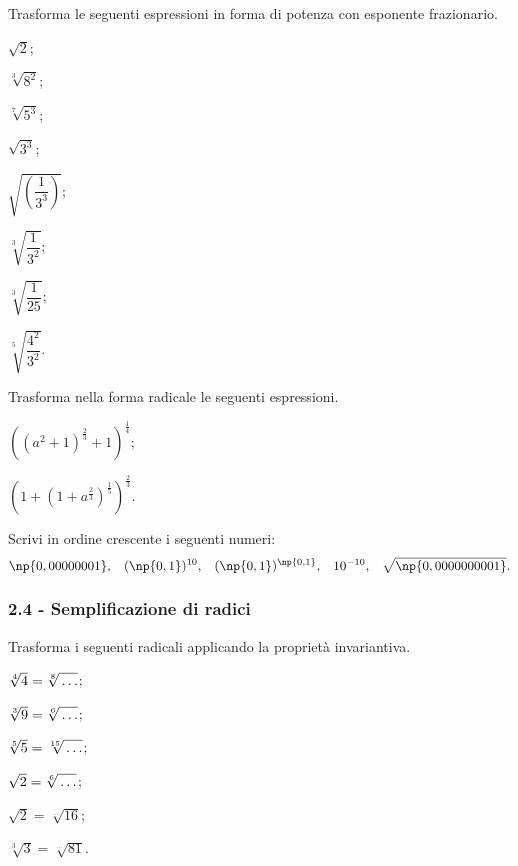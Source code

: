 \begin{esercizio}[\Ast]
 \label{ese:2.19}
Trasforma le seguenti espressioni in forma di potenza con esponente frazionario.
 \begin{multicols}{3}
 \begin{enumeratea}
 \item $\sqrt 2$;
 \item $\sqrt[3]{8^2}$;
 \item $\sqrt[7]{5^3}$;
 \item $\sqrt{3^3}$;
 \item $\sqrt{\left(\dfrac 1{3^3}\right)}$;
 \item $\sqrt[3]{\dfrac 1{3^2}}$;
 \item $\sqrt[3]{\dfrac 1{25}}$;
 \item $\sqrt[5]{\dfrac{4^2}{3^2}}$.
 \end{enumeratea}
 \end{multicols}
\end{esercizio}
\pagebreak
\begin{esercizio}[\Ast]
\label{ese:2.20}
 Trasforma nella forma radicale le seguenti espressioni.
 \begin{multicols}{2}
 \begin{enumeratea}
 \item $\left(\left(a^2+1\right)^{\frac 2 3}+1\right)^{\frac 1 4}$;
 \item $\left(1+\left(1+a^{\frac 2 3}\right)^{\frac 1 5}\right)^{\frac 2 3}$.
 \end{enumeratea}
 \end{multicols}
\end{esercizio}

\begin{esercizio}
 \label{ese:2.21}
Scrivi in ordine crescente i seguenti numeri:
 \[\np{0,00000001}\text{,}\quad (\np{0,1})^{10}\text{,}\quad (\np{0,1})^{\np{0,1}}\text{,}\quad 10^{-10}\text{,}\quad \sqrt{\np{0,0000000001}}.\]
\end{esercizio}

\subsubsection*{2.4 - Semplificazione di radici}
\begin{esercizio}
 \label{ese:2.22}
Trasforma i seguenti radicali applicando la proprietà invariantiva.
 \begin{multicols}{3}
 \begin{enumeratea}
 \item $\sqrt[4]4=\sqrt[8]{\vphantom{4}\ldots}$;
 \item $\sqrt[3]9=\sqrt[6]{\vphantom{4}\ldots}$;
 \item $\sqrt[5]5=\sqrt[15]{\vphantom{4}\ldots}$;
 \item $\sqrt 2=\sqrt[6]{\vphantom{4}\ldots}$;
 \item $\sqrt 2=\sqrt[\ldots]{16}$;
 \item $\sqrt[3]3=\sqrt[\ldots]{81}$.
 \end{enumeratea}
 \end{multicols}
\end{esercizio}

